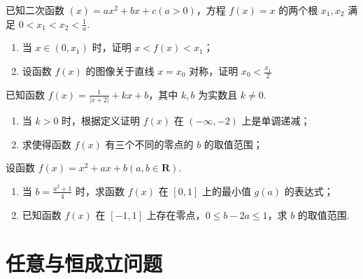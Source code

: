 \documentclass[a4paper , final]{ctexart}
\newenvironment{problem}[1]{%
  \item #1
  \par
  \vspace{8cm}
}{}
\begin{document}
\begin{problems}
    \begin{problem}
    {
    已知二次函数 $ (x) = ax^2+bx+c(a>0)$，方程 $ f(x) = x$ 的两个根 $x_1,x_2$ 满足 $0<x_1<x_2<\frac{1}{a}$.
    \begin{enumerate}[label=(\arabic*)]
        \item 当 $ x\in (0,x_1)$ 时，证明 $ x<f(x)<x_1$；
        \item 设函数 $f(x)$ 的图像关于直线 $ x=x_0$ 对称，证明 $ x_0 < \frac{x_1}{2}$
    \end{enumerate}
    }
    \end{problem}

    \begin{problem}
    {
    已知函数 $ f(x) = \frac{1}{\vert x+2 \vert} +kx+b$，其中 $k,b$ 为实数且 $k\neq 0$.
    \begin{enumerate}[label=(\arabic*)]
        \item 当 $ k > 0$ 时，根据定义证明 $ f(x)$ 在 $ (-\infty, -2)$ 上是单调递减；
        \item 求使得函数 $f(x)$ 有三个不同的零点的 $b$ 的取值范围；
    \end{enumerate}
    }
    \end{problem}

    \begin{problem}
    {
    设函数 $ f(x) = x^2 +ax+b(a,b\in \mathbf{R})$.
    \begin{enumerate}[label=(\arabic*)]
        \item 当 $ b = \frac{a^2+1}{4}$ 时，求函数 $ f(x)$ 在 $ [0,1]$ 上的最小值 $ g(a)$ 的表达式；
        \item 已知函数 $ f(x)$ 在 $ [-1,1]$ 上存在零点，$ 0\leq b-2a\leq 1$，求 $ b$ 的取值范围.
    \end{enumerate}
    }
    \end{problem}
\end{problems}

\newpage
\section*{任意与恒成立问题}
\end{document}
